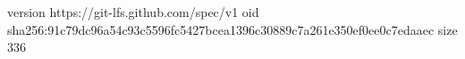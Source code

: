 version https://git-lfs.github.com/spec/v1
oid sha256:91c79dc96a54c93c5596fc5427bcea1396c30889c7a261e350ef0ee0c7edaaec
size 336
